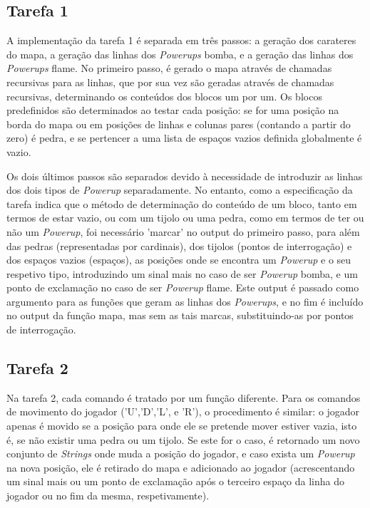 \documentclass[a4paper]{report}
\begin{document}
\subsection{Tarefa 1}
A implementação da tarefa 1 é separada em três passos: a geração dos carateres do mapa, a geração das linhas dos \textit{Powerups} bomba, e a geração das linhas dos \textit{Powerups} flame. No primeiro passo, é gerado o mapa através de chamadas recursivas para as linhas, que por sua vez são geradas através de chamadas recursivas, determinando os conteúdos dos blocos um por um. Os blocos predefinidos são determinados ao testar cada posição: se for uma posição na borda do mapa ou em posições de linhas e colunas pares (contando a partir do zero) é pedra, e se pertencer a uma lista de espaços vazios definida globalmente é vazio.

Os dois últimos passos são separados devido à necessidade de introduzir as linhas dos dois tipos de \textit{Powerup} separadamente. No entanto, como a especificação da tarefa indica que o método de determinação do conteúdo de um bloco, tanto em termos de estar vazio, ou com um tijolo ou uma pedra, como em termos de ter ou não um \textit{Powerup}, foi necessário 'marcar' no output do primeiro passo, para além das pedras (representadas por cardinais), dos tijolos (pontos de interrogação) e dos espaços vazios (espaços), as posições onde se encontra um \textit{Powerup} e o seu respetivo tipo, introduzindo um sinal mais no caso de ser \textit{Powerup} bomba, e um ponto de exclamação no caso de ser \textit{Powerup} flame. Este output é passado como argumento para as funções que geram as linhas dos \textit{Powerups}, e no fim é incluído no output da função mapa, mas sem as tais marcas, substituindo-as por pontos de interrogação.

\subsection{Tarefa 2}
Na tarefa 2, cada comando é tratado por um função diferente. Para os comandos de movimento do jogador ('U','D','L', e 'R'), o procedimento é similar: o jogador apenas é movido se a posição para onde ele se pretende mover estiver vazia, isto é, se não existir uma pedra ou um tijolo. Se este for o caso, é retornado um novo conjunto de \textit{Strings} onde muda a posição do jogador, e caso exista um \textit{Powerup} na nova posição, ele é retirado do mapa e adicionado ao jogador (acrescentando um sinal mais ou um ponto de exclamação após o terceiro espaço da linha do jogador ou no fim da mesma, respetivamente).
\end{document}
